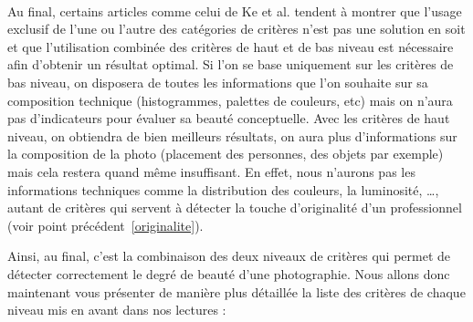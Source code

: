 \documentclass[11pt, french,screen]{report-rd-info}
\begin{document}
\paragraph*{}
Au final, certains articles comme celui de Ke et al. tendent à montrer que l'usage exclusif de l'une ou l'autre des catégories de critères n’est pas une solution en soit et que l’utilisation combinée des critères de haut et de bas niveau est nécessaire afin d’obtenir un résultat optimal. Si l’on se base uniquement sur les critères de bas niveau, on disposera de toutes les informations que l’on souhaite sur sa composition technique (histogrammes, palettes de couleurs, etc) mais on n’aura pas d’indicateurs pour évaluer sa beauté conceptuelle. Avec les critères de haut niveau, on obtiendra de bien meilleurs résultats, on aura plus d’informations sur la composition de la photo (placement des personnes, des objets par exemple) mais cela restera quand même insuffisant. En effet, nous n’aurons pas les informations techniques comme la distribution des couleurs, la luminosité, \ldots, autant de critères qui servent à détecter la touche d’originalité d’un professionnel (voir point précédent~\ref{originalite}).

Ainsi, au final, c’est la combinaison des deux niveaux de critères qui permet de détecter correctement le degré de beauté d’une photographie.
Nous allons donc maintenant vous présenter de manière plus détaillée la liste des critères de chaque niveau mis en avant dans nos lectures :
\end{document}
